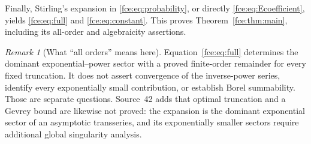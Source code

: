 \documentclass[11pt,a4paper]{article}
\numberwithin{equation}{section}
\theoremstyle{definition}\newtheorem{definition}[theorem]{Definition}
\theoremstyle{remark}\newtheorem{remark}[theorem]{Remark}
\begin{document}
Finally, Stirling's expansion in
\eqref{fce:eq:probability}, or directly \eqref{fce:eq:Ecoefficient}, yields
\eqref{fce:eq:full} and \eqref{fce:eq:constant}. This proves
Theorem~\ref{fce:thm:main}, including its all-order and algebraicity assertions.

\begin{remark}[What ``all orders'' means here]
Equation~\eqref{fce:eq:full} determines the dominant exponential--power sector
with a proved finite-order remainder for every fixed truncation. It does
not assert convergence of the inverse-power series, identify every
exponentially small contribution, or establish Borel summability.
Those are separate questions. Source~42 adds that optimal truncation and a
Gevrey bound are likewise not proved: the expansion is the dominant
exponential sector of an asymptotic transseries, and its exponentially
smaller sectors require additional global singularity analysis.
\end{remark}
\end{document}
